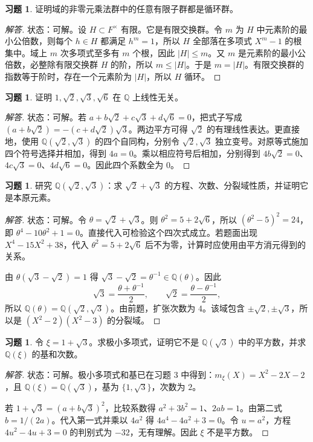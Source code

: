 \documentclass[11pt,a4paper,openany]{ctexbook}
\numberwithin{equation}{chapter}
\newcommand{\Q}{\mathbb{Q}}
\theoremstyle{plain}
\theoremstyle{definition}
\newtheorem{exercise}[theorem]{习题}
\theoremstyle{remark}
\begin{document}
\begin{exercise}
证明域的非零元乘法群中的任意有限子群都是循环群。
\end{exercise}
\begin{proof}[解答]
状态：可解。设 $H\subset F^\times$ 有限。它是有限交换群。令 $m$ 为 $H$ 中元素阶的最小公倍数，则每个 $h\in H$ 都满足 $h^m=1$，所以 $H$ 全部落在多项式 $X^m-1$ 的根集中。域上 $m$ 次多项式至多有 $m$ 个根，因此 $|H|\le m$。又 $m$ 是元素阶的最小公倍数，必整除有限交换群 $H$ 的阶，所以 $m\le |H|$。于是 $m=|H|$。有限交换群的指数等于阶时，存在一个元素阶为 $|H|$，所以 $H$ 循环。
\end{proof}

\begin{exercise}
证明 $1,\sqrt2,\sqrt3,\sqrt6$ 在 $\Q$ 上线性无关。
\end{exercise}
\begin{proof}[解答]
状态：可解。若 $a+b\sqrt2+c\sqrt3+d\sqrt6=0$，把式子写成 $(a+b\sqrt2)=-(c+d\sqrt2)\sqrt3$。两边平方可得 $\sqrt2$ 的有理线性表达。更直接地，使用 $\Q(\sqrt2,\sqrt3)$ 的四个自同构，分别令 $\sqrt2,\sqrt3$ 独立变号。对原等式施加四个符号选择并相加，得到 $4a=0$。乘以相应符号后相加，分别得到 $4b\sqrt2=0$、$4c\sqrt3=0$、$4d\sqrt6=0$。因此四个系数全为 $0$。
\end{proof}

\begin{exercise}
研究 $\Q(\sqrt2,\sqrt3)$：求 $\sqrt2+\sqrt3$ 的方程、次数、分裂域性质，并证明它是本原元素。
\end{exercise}
\begin{proof}[解答]
状态：可解。令 $\theta=\sqrt2+\sqrt3$。则 $\theta^2=5+2\sqrt6$，所以 $(\theta^2-5)^2=24$，即 $\theta^4-10\theta^2+1=0$。直接代入可检验这个四次式成立。若题面出现 $X^4-15X^2+38$，代入 $\theta^2=5+2\sqrt6$ 后不为零，计算时应使用由平方消元得到的关系。

由 $\theta(\sqrt3-\sqrt2)=1$ 得 $\sqrt3-\sqrt2=\theta^{-1}\in\Q(\theta)$。因此
\[
\sqrt3=\frac{\theta+\theta^{-1}}2,\qquad \sqrt2=\frac{\theta-\theta^{-1}}2,
\]
所以 $\Q(\theta)=\Q(\sqrt2,\sqrt3)$。由前题，扩张次数为 $4$。该域包含 $\pm\sqrt2,\pm\sqrt3$，所以是 $(X^2-2)(X^2-3)$ 的分裂域。
\end{proof}

\begin{exercise}
令 $\xi=1+\sqrt3$。求极小多项式，证明它不是 $\Q(\sqrt3)$ 中的平方数，并求 $\Q(\xi)$ 的基和次数。
\end{exercise}
\begin{proof}[解答]
状态：可解。极小多项式和基已在习题 3 中得到：$m_\xi(X)=X^2-2X-2$，且 $\Q(\xi)=\Q(\sqrt3)$，基为 $\{1,\sqrt3\}$，次数为 $2$。

若 $1+\sqrt3=(a+b\sqrt3)^2$，比较系数得 $a^2+3b^2=1$、$2ab=1$。由第二式 $b=1/(2a)$。代入第一式并乘以 $4a^2$ 得 $4a^4-4a^2+3=0$。令 $u=a^2$，方程 $4u^2-4u+3=0$ 的判别式为 $-32$，无有理解。因此 $\xi$ 不是平方数。
\end{proof}
\end{document}
